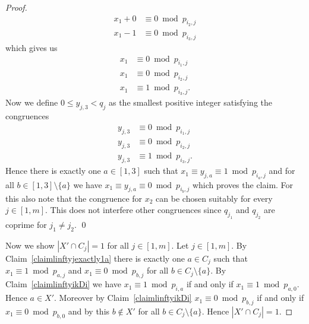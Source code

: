 \documentclass{article}
\begin{document}
\begin{proof}
\begin{align*}
x_1 + 0 &\equiv 0 \bmod p_{i_2,j}\\
x_1 - 1 &\equiv 0 \bmod p_{i_3,j}
\end{align*}
which gives us
\begin{align*}
x_1 &\equiv 0 \bmod p_{i_1,j}\\
x_1 &\equiv 0 \bmod p_{i_2,j}\\
x_1 &\equiv 1 \bmod p_{i_3,j}.
\end{align*}
Now we define $0 \leq y_{j,3} < q_j$ as the smallest positive integer satisfying the congruences
\begin{align*}
y_{j,3} &\equiv 0 \bmod p_{i_1,j}\\
y_{j,3} &\equiv 0 \bmod p_{i_2,j}\\
y_{j,3} &\equiv 1 \bmod p_{i_3,j}.
\end{align*}
Hence there is exactly one $a \in [1,3]$ such that $x_1 \equiv y_{j,a} \equiv 1 \bmod p_{i_a,j}$ and for all $b \in [1,3] \setminus \{a\}$ we have $x_1 \equiv y_{j,a} \equiv 0 \bmod p_{i_b,j}$ which proves the claim. For this also note that the congruence for $x_2$ can be chosen suitably for every $j \in [1,m]$. This does not interfere other congruences since $q_{j_1}$ and $q_{j_2}$ are coprime for $j_1 \neq j_2$.
\qed

Now we show $|X' \cap C_j| = 1$ for all $j \in [1,m]$. Let $j \in [1,m]$. By Claim~\ref{claimlinftyjexactly1a} there is exactly one $a \in C_j$ such that $x_1 \equiv 1 \bmod p_{a,j}$ and $x_1 \equiv 0 \bmod p_{b,j}$ for all $b \in C_j \setminus \{a\}$. By Claim~\ref{claimlinftyikDi} we have $x_1 \equiv 1 \bmod p_{i,a}$ if and only if $x_1 \equiv 1 \bmod p_{a,0}$. Hence $a \in X'$. Moreover by Claim~\ref{claimlinftyikDi} $x_1 \equiv 0 \bmod p_{b,j}$ if and only if $x_1 \equiv 0 \bmod p_{b,0}$ and by this $b \not \in X'$ for all $b \in C_j \setminus\{a\}$. Hence $|X' \cap C_j| = 1$.


\end{proof}
\end{document}
